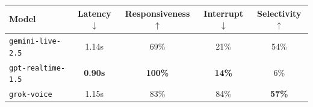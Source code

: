 \begin{tabular}{@{}lcccc@{}}
\toprule
{\color{red!75!black}\textbf{Model}} & \textbf{Latency}$\downarrow$ & \textbf{Responsiveness}$\uparrow$ & \textbf{Interrupt}$\downarrow$ & \textbf{Selectivity}$\uparrow$ \\
\midrule
{\color{red!75!black}\texttt{gemini-live-2.5}} & 1.14s & 69\% & 21\% & 54\% \\
{\color{red!75!black}\texttt{gpt-realtime-1.5}} & \textbf{0.90s} & \textbf{100\%} & \textbf{14\%} & 6\% \\
{\color{red!75!black}\texttt{grok-voice}} & 1.15s & 83\% & 84\% & \textbf{57\%} \\
\bottomrule
\end{tabular}